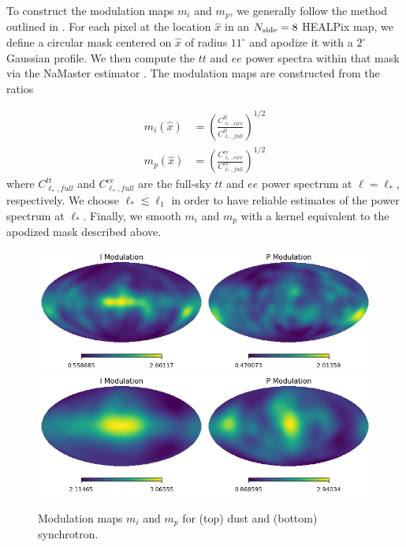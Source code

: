 \documentclass[twocolumn]{aastex631}
\begin{document}
To construct the modulation maps $m_i$ and $m_p$, we generally follow the method outlined in \citet{Thorne:2017}. For each pixel at the location $\hat{x}$ in an $N_{\rm side} = 8$ HEALPix map, we define a circular mask centered on $\hat{x} $ of radius $11^\circ$  and apodize it with a $2^\circ$ Gaussian profile. We then compute the $tt$ and $ee$ power spectra within that mask via the NaMaster estimator \citep{Alonso:2019}. The modulation maps are constructed from the ratios 

\begin{align}
    m_i\left(\hat{x} \right) &= \left(\frac{C^{tt}_{\ell_*,circ}}{C^{tt}_{\ell_*,full}}\right)^{1/2} \\
    m_p\left(\hat{x}\right) &= \left(\frac{C^{ee}_{\ell_*,circ}}{C^{ee}_{\ell_*,full}}\right)^{1/2}
\end{align}
where $C^{tt}_{\ell_*,full}$ and $C^{ee}_{\ell_*,full}$ are the full-sky $tt$ and $ee$ power spectrum at $\ell = \ell_*$, respectively. We choose $\ell_* \lesssim \ell_1$ in order to have reliable estimates of the power spectrum at $\ell_*$. Finally, we smooth $m_i$ and $m_p$ with a kernel equivalent to the apodized mask described above. 
 
 \begin{figure}
     \centering
     \includegraphics[width=2\columnwidth]{figures/mod_dust.png}\\
      \includegraphics[width=2\columnwidth]{figures/mod_synch.png}\\
     \caption{Modulation maps $m_i$ and $m_p$ for (top) dust and  (bottom) synchrotron. }
     \label{fig:modulation_maps}
 \end{figure}
 
\end{document}
